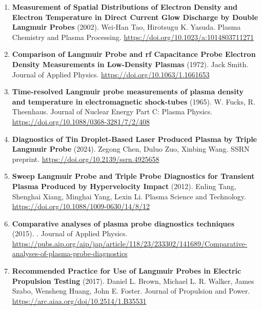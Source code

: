 \documentclass[11pt,a4paper]{article}
\begin{document}
\begin{enumerate}[leftmargin=1.4em]
\item \textbf{Measurement of Spatial Distributions of Electron Density and Electron Temperature in Direct Current Glow Discharge by Double Langmuir Probes} (2002). Wei-Han Tao, Hirotsugu K. Yasuda. Plasma Chemistry and Plasma Processing. \url{https://doi.org/10.1023/a:1014803711271}
\item \textbf{Comparison of Langmuir Probe and rf Capacitance Probe Electron Density Measurements in Low-Density Plasmas} (1972). Jack Smith. Journal of Applied Physics. \url{https://doi.org/10.1063/1.1661653}
\item \textbf{Time-resolved Langmuir probe measurements of plasma density and temperature in electromagnetic shock-tubes} (1965). W. Fucks, R. Theenhaus. Journal of Nuclear Energy Part C: Plasma Physics. \url{https://doi.org/10.1088/0368-3281/7/2/408}
\item \textbf{Diagnostics of Tin Droplet-Based Laser Produced Plasma by Triple Langmuir Probe} (2024). Zegong Chen, Duluo Zuo, Xinbing Wang. SSRN preprint. \url{https://doi.org/10.2139/ssrn.4925658}
\item \textbf{Sweep Langmuir Probe and Triple Probe Diagnostics for Transient Plasma Produced by Hypervelocity Impact} (2012). Enling Tang, Shenghai Xiang, Minghai Yang, Lexin Li. Plasma Science and Technology. \url{https://doi.org/10.1088/1009-0630/14/8/12}
\item \textbf{Comparative analyses of plasma probe diagnostics techniques} (2015). . Journal of Applied Physics. \url{https://pubs.aip.org/aip/jap/article/118/23/233302/141689/Comparative-analyses-of-plasma-probe-diagnostics}
\item \textbf{Recommended Practice for Use of Langmuir Probes in Electric Propulsion Testing} (2017). Daniel L. Brown, Michael L. R. Walker, James Szabo, Wensheng Huang, John E. Foster. Journal of Propulsion and Power. \url{https://arc.aiaa.org/doi/10.2514/1.B35531}
\end{enumerate}
\end{document}
